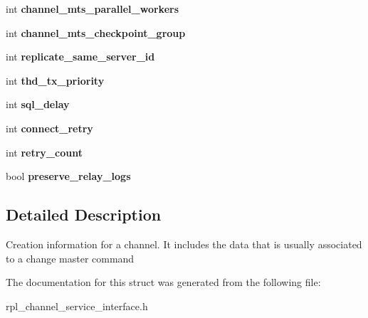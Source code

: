 \begin{DoxyCompactItemize}
\item 
\mbox{\label{structst__channel__info_a7bbef3c30009099347ad87bb0d99f991}} 
int {\bfseries channel\+\_\+mts\+\_\+parallel\+\_\+workers}
\item 
\mbox{\label{structst__channel__info_adebad1c0e8c9bcd8db337ba57f1f9c2e}} 
int {\bfseries channel\+\_\+mts\+\_\+checkpoint\+\_\+group}
\item 
\mbox{\label{structst__channel__info_a9bef0aa2c595de249b08829b121a6648}} 
int {\bfseries replicate\+\_\+same\+\_\+server\+\_\+id}
\item 
\mbox{\label{structst__channel__info_ab412b778b1a03094b82f2b046dc9f5bf}} 
int {\bfseries thd\+\_\+tx\+\_\+priority}
\item 
\mbox{\label{structst__channel__info_aa380cbc54e4a696ee027cc0fdc03ec04}} 
int {\bfseries sql\+\_\+delay}
\item 
\mbox{\label{structst__channel__info_a351e383508bb0d07b9301a9301d7bfc6}} 
int {\bfseries connect\+\_\+retry}
\item 
\mbox{\label{structst__channel__info_a4f8d607c6c08ea41aa797276b5a3b8b1}} 
int {\bfseries retry\+\_\+count}
\item 
\mbox{\label{structst__channel__info_a738f29ff6703e82f2f5e2a7895f381d2}} 
bool {\bfseries preserve\+\_\+relay\+\_\+logs}
\end{DoxyCompactItemize}


\subsection{Detailed Description}
Creation information for a channel. It includes the data that is usually associated to a change master command 

The documentation for this struct was generated from the following file\+:\begin{DoxyCompactItemize}
\item 
rpl\+\_\+channel\+\_\+service\+\_\+interface.\+h\end{DoxyCompactItemize}
